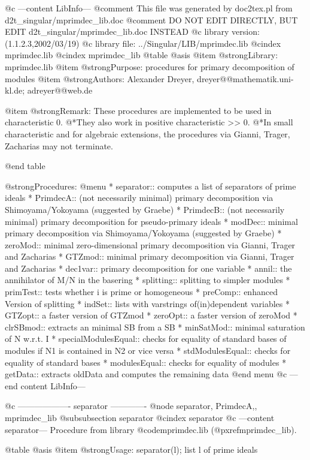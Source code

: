 @c ---content LibInfo---
@comment This file was generated by doc2tex.pl from d2t_singular/mprimdec_lib.doc
@comment DO NOT EDIT DIRECTLY, BUT EDIT d2t_singular/mprimdec_lib.doc INSTEAD
@c library version: (1.1.2.3,2002/03/19)
@c library file: ../Singular/LIB/mprimdec.lib
@cindex mprimdec.lib
@cindex mprimdec_lib
@table @asis
@item @strong{Library:}
mprimdec.lib
@item @strong{Purpose:}
   procedures for primary decomposition of modules
@item @strong{Authors:}
Alexander Dreyer, dreyer@@mathematik.uni-kl.de; adreyer@@web.de

@item @strong{Remark:}
These procedures are implemented to be used in characteristic 0.
@*They also work in positive characteristic >> 0.
@*In small characteristic and for algebraic extensions, the
procedures via Gianni, Trager, Zacharias may not terminate.

@end table

@strong{Procedures:}
@menu
* separator:: computes a list of separators of prime ideals
* PrimdecA:: (not necessarily minimal) primary decomposition via Shimoyama/Yokoyama (suggested by Graebe)
* PrimdecB:: (not necessarily minimal) primary decomposition for pseudo-primary ideals
* modDec:: minimal primary decomposition via Shimoyama/Yokoyama (suggested by Graebe)
* zeroMod:: minimal zero-dimensional primary decomposition via Gianni, Trager and Zacharias
* GTZmod:: minimal primary decomposition via Gianni, Trager and Zacharias
* dec1var:: primary decomposition for one variable
* annil:: the annihilator of M/N in the basering
* splitting:: splitting to simpler modules
* primTest:: tests whether i is prime or homogeneous
* preComp:: enhanced Version of splitting
* indSet:: lists with varstrings of(in)dependent variables
* GTZopt:: a faster version of GTZmod
* zeroOpt:: a faster version of zeroMod
* clrSBmod:: extracts an minimal SB from a SB
* minSatMod:: minimal saturation of N w.r.t. I
* specialModulesEqual:: checks for equality of standard bases of modules if N1 is contained in N2 or vice versa
* stdModulesEqual:: checks for equality of standard bases
* modulesEqual:: checks for equality of modules
* getData:: extracts oldData and computes the remaining data
@end menu
@c ---end content LibInfo---

@c ------------------- separator -------------
@node separator, PrimdecA,, mprimdec_lib
@subsubsection separator
@cindex separator
@c ---content separator---
Procedure from library @code{mprimdec.lib} (@pxref{mprimdec_lib}).

@table @asis
@item @strong{Usage:}
separator(l); list l of prime ideals

